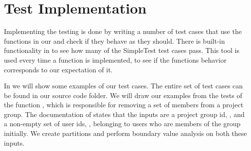 \section{Test Implementation}
\label{sec:testimplementation}
\newcommand{\vargroupid}{\vari{group\_id}}
\newcommand{\varuserids}{\vari{users}}
Implementing the testing is done by writing a number of test cases that use the functions in our \subsystem{} and check if they behave as they should.
There is built-in functionality in \moodle{} to see how many of the SimpleTest test cases pass.
This tool is used every time a function is implemented, to see if the functions behavior corresponds to our expectation of it.

In  we will show some examples of our test cases.
The entire set of test cases can be found in our source code folder.
We will draw our examples from the tests of the function , which is responsible for removing a set of members from a project group.
The documentation of  states that the inputs are a project group id, \vargroupid{}, and a non-empty set of user ids, \varuserids{}, belonging to users who are members of the group initially.
We create partitions and perform boundary value analysis on both these inputs.

